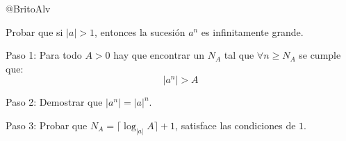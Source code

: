 \documentclass[14pt]{extarticle}
\begin{document}
@BritoAlv



\begin{tcolorbox}[colback=blue!5!white,colframe=blue!75!black, title = Inf Grande]

Probar que si $\vert a \vert > 1$, entonces la sucesión $a^n$ es infinitamente grande.

\end{tcolorbox}

\begin{tcolorbox}[colback=red!5!white,colframe=red!75!black, title = Solución]

    Paso 1: Para todo $A > 0$ hay que encontrar un $N_A$ tal que $\forall n \geq N_A$ se cumple que:
    $$\vert a^n \vert > A$$

    Paso 2: Demostrar que $\vert a^n \vert = \vert a \vert^n $.

    Paso 3: Probar que $N_A = \lceil \log_{\vert a \vert } A \rceil +1 $, satisface las condiciones de $1$.

\end{tcolorbox}
\end{document}
